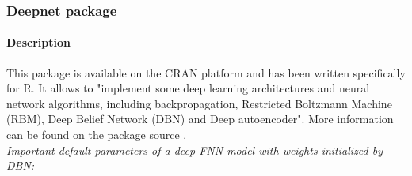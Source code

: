 \documentclass[letter,8pt]{article}\usepackage[]{graphicx}\usepackage[]{color}
\begin{document}
\subsubsection{Deepnet package}
\paragraph{Description}
This package is available on the CRAN platform and has been written specifically for R. It allows to "implement some deep learning architectures and neural network algorithms, including backpropagation, Restricted Boltzmann Machine (RBM), Deep Belief Network (DBN) and Deep autoencoder". More information can be found on the package source \cite{deepnet2015}.\\
\textit{Important default parameters of a deep FNN model with weights initialized by DBN:}
\end{document}
